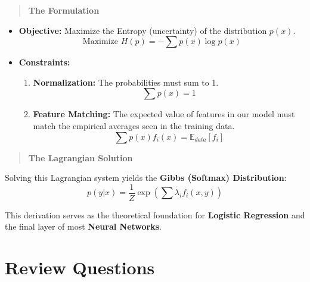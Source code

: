 \documentclass[
  letterpaper,
  DIV=11,
  numbers=noendperiod]{scrreprt}
\providecommand{\tightlist}{%
  \setlength{\itemsep}{0pt}\setlength{\parskip}{0pt}}
\begin{document}
\begin{quote}
\textbf{The Formulation}
\end{quote}

\begin{itemize}
\item
  \textbf{Objective:} Maximize the Entropy (uncertainty) of the
  distribution \(p(x)\).
  \[\text{Maximize } H(p) = -\sum p(x) \log p(x)\]
\item
  \textbf{Constraints:}

  \begin{enumerate}
  \def\labelenumi{\arabic{enumi}.}
  \tightlist
  \item
    \textbf{Normalization:} The probabilities must sum to 1.
    \[\sum p(x) = 1\]
  \item
    \textbf{Feature Matching:} The expected value of features in our
    model must match the empirical averages seen in the training data.
    \[\sum p(x) f_i(x) = \mathbb{E}_{data}[f_i]\]
  \end{enumerate}
\end{itemize}

\begin{quote}
\textbf{The Lagrangian Solution}
\end{quote}

Solving this Lagrangian system yields the \textbf{Gibbs (Softmax)
Distribution}:
\[p(y|x) = \frac{1}{Z} \exp\left(\sum \lambda_i f_i(x, y)\right)\]

\begin{tcolorbox}[enhanced jigsaw, leftrule=.75mm, rightrule=.15mm, colback=white, colbacktitle=quarto-callout-note-color!10!white, arc=.35mm, opacityback=0, toptitle=1mm, bottomrule=.15mm, bottomtitle=1mm, titlerule=0mm, title=\textcolor{quarto-callout-note-color}{\faInfo}\hspace{0.5em}{Insights:}, toprule=.15mm, left=2mm, coltitle=black, breakable, colframe=quarto-callout-note-color-frame, opacitybacktitle=0.6]

This derivation serves as the theoretical foundation for
\textbf{Logistic Regression} and the final layer of most \textbf{Neural
Networks}.

\end{tcolorbox}

\section{Review Questions}\label{review-questions-5}
\end{document}
